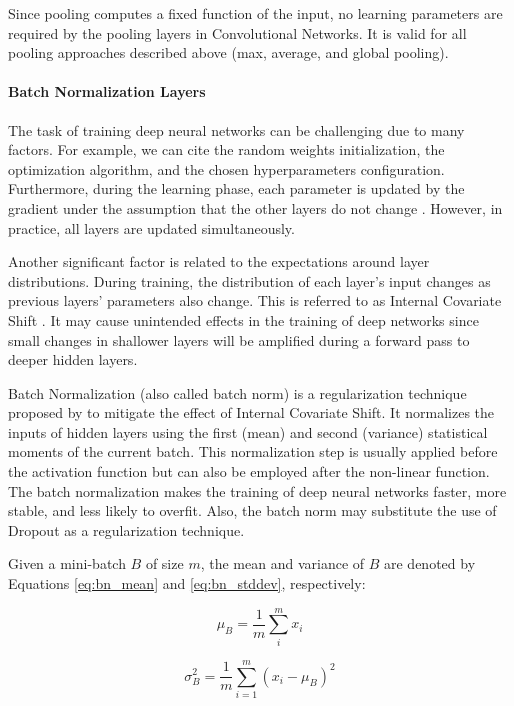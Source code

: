 Since pooling computes a fixed function of the input, no learning parameters are required by the pooling layers in Convolutional Networks. It is valid for all pooling approaches described above (max, average, and global pooling).

\paragraph{Batch Normalization Layers}

The task of training deep neural networks can be challenging due to many factors. For example, we can cite the random weights initialization, the optimization algorithm, and the chosen hyperparameters configuration. Furthermore, during the learning phase, each parameter is updated by the gradient under the assumption that the other layers do not change \citep{goodfellow2016deep}. However, in practice, all layers are updated simultaneously.

Another significant factor is related to the expectations around layer distributions. During training, the distribution of each layer's input changes as previous layers' parameters also change. This is referred to as Internal Covariate Shift \citep{ioffe2015batch}. It may cause unintended effects in the training of deep networks since small changes in shallower layers will be amplified during a forward pass to deeper hidden layers.

Batch Normalization (also called batch norm) is a regularization technique proposed by \cite{ioffe2015batch} to mitigate the effect of Internal Covariate Shift. It normalizes the inputs of hidden layers using the first (mean) and second (variance) statistical moments of the current batch. This normalization step is usually applied before the activation function but can also be employed after the non-linear function. The batch normalization makes the training of deep neural networks faster, more stable, and less likely to overfit. Also, the batch norm may substitute the use of Dropout as a regularization technique.

Given a mini-batch $B$ of size $m$, the mean and variance of $B$ are denoted by Equations \ref{eq:bn_mean} and \ref{eq:bn_stddev}, respectively:

\begin{equation}
\label{eq:bn_mean}
\mu_B = \frac{1}{m} \sum_{i}^{m} x_i
\end{equation}

\begin{equation}
\label{eq:bn_stddev}
\sigma_B^2 = \frac{1}{m} \sum_{i=1}^{m} (x_i - \mu_B)^{2}
\end{equation}

